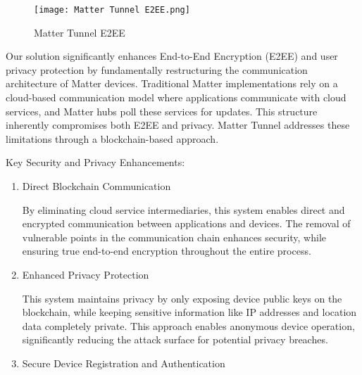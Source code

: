 \documentclass[conference]{IEEEtran}
\begin{document}
\begin{enumerate}[itemsep=2ex, parsep=1ex]
	      \begin{figure}[h!]
	      	\centering
	      	\texttt{[image: Matter Tunnel E2EE.png]}
	      	\caption{Matter Tunnel E2EE}
	      	\label{fig:MatterTunnelE2EE}
	      \end{figure}
	      	      	      
	      Our solution significantly enhances End-to-End Encryption (E2EE) and user
	      privacy protection by fundamentally restructuring the communication
	      architecture of Matter devices. Traditional Matter implementations rely on
	      a cloud-based communication model where applications communicate with cloud
	      services, and Matter hubs poll these services for updates. This structure inherently
	      compromises both E2EE and privacy. Matter Tunnel addresses these
	      limitations through a blockchain-based approach.
	      	      	      
	      Key Security and Privacy Enhancements:
	      	      	      
	      \begin{enumerate}[itemsep=2ex, parsep=1ex]
	      	\item Direct Blockchain Communication
	      	      	      	      	      	      
	      	      By eliminating cloud service intermediaries, this system enables direct
	      	      and encrypted communication between applications and devices. The
	      	      removal of vulnerable points in the communication chain enhances
	      	      security, while ensuring true end-to-end encryption throughout the entire
	      	      process.
	      	      	      	      	      	      
	      	\item Enhanced Privacy Protection
	      	      	      	      	      	      
	      	      This system maintains privacy by only exposing device public keys on
	      	      the blockchain, while keeping sensitive information like IP addresses and
	      	      location data completely private. This approach enables anonymous
	      	      device operation, significantly reducing the attack surface for potential
	      	      privacy breaches.
	      	      	      	      	      	      
	      	\item Secure Device Registration and Authentication
	      	      	      	      	      	                      

\end{enumerate}
\end{enumerate}
\end{document}
